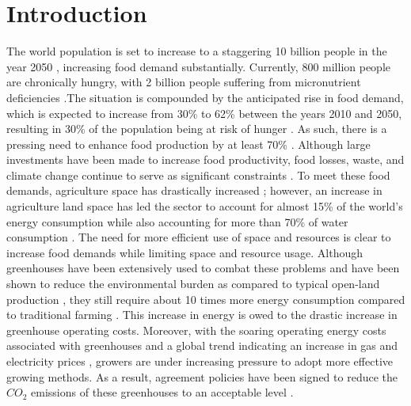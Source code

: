 \chapter{Introduction}
\label{chapter:introduction, written in the present tense}

The world population is set to increase to a staggering 10 billion people in the year 2050 \cite{blazhevskaGrowingSlowerPace2019}, increasing food demand substantially. Currently, 800 million people are chronically hungry, with 2 billion people suffering from micronutrient deficiencies \cite{faoFutureFoodAgriculture2017}.The situation is compounded by the anticipated rise in food demand, which is expected to increase from 30\% to 62\% between the years 2010 and 2050, resulting in 30\% of the population being at risk of hunger \cite{vandijkMetaanalysisProjectedGlobal2021}. As such, there is a pressing need to enhance food production by at least 70\% \cite{nishatGreenDealGreenhouse2020}. Although large investments have been made to increase food productivity, food losses, waste, and climate change continue to serve as significant constraints \cite{faoFutureFoodAgriculture2017}. To meet these food demands, agriculture space has drastically increased \cite{winklerGlobalLandUse2021}; however, an increase in agriculture land space has led the sector to account for almost 15\% of the world's energy consumption while also accounting for more than 70\% of water consumption \cite{nishatGreenDealGreenhouse2020}. The need for more efficient use of space and resources is clear to increase food demands while limiting space and resource usage. Although greenhouses have been extensively used to combat these problems and have been shown to reduce the environmental burden as compared to typical open-land production \cite{munozComparingEnvironmentalImpacts2008}, they still require about 10 times more energy consumption compared to traditional farming \cite{nishatGreenDealGreenhouse2020}. This increase in energy is owed to the drastic increase in greenhouse operating costs.  Moreover, with the soaring operating energy costs associated with greenhouses and a global trend indicating an increase in gas and electricity prices \cite{alvarezWhatSoaringEnergy2021}, growers are under increasing pressure to adopt more effective growing methods. As a result, agreement policies have been signed to reduce the $CO_2$ emissions of these greenhouses to an acceptable level \cite{breukersPowerDutchGreenhouse}. \\

